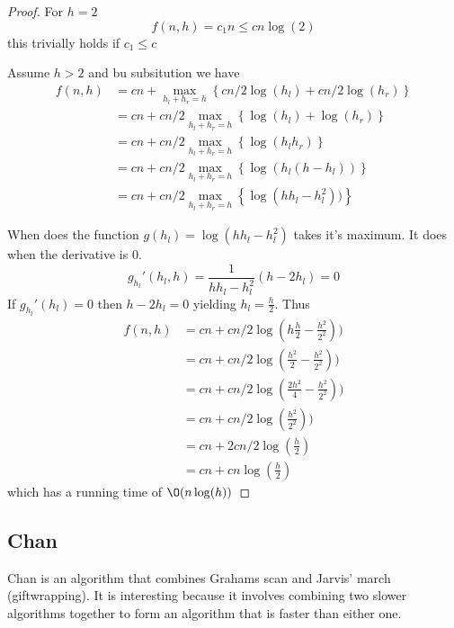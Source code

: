 \documentclass[10pt]{article}
\begin{document}
\begin{proof}

  For $h=2$                
  \begin{equation}
    f(n,h) = c_1n \leq cn\log(2)
  \end{equation}
  this trivially holds if $c_1 \leq c$
  
  Assume $h>2$ and bu subsitution we have
  \begin{align*}
   f(n,h) &= cn + \max_{h_l+h_r = h}\left\{cn/2\log(h_l)+cn/2\log(h_r)\right\} \\
          &= cn + cn/2\max_{h_l+h_r = h}\left\{\log(h_l)+\log(h_r)\right\} \\
          &= cn + cn/2\max_{h_l+h_r = h}\left\{\log(h_lh_r)\right\} \\          
          &= cn + cn/2\max_{h_l+h_r = h}\left\{\log(h_l(h-h_l))\right\} \\         
          &= cn + cn/2\max_{h_l+h_r = h}\left\{\log(hh_l-h_l^2))\right\}                    
  \end{align*}
    
  When does the function $g(h_l) = \log(hh_l-h_l^2)$ takes it's maximum. It does when the derivative is $0$.
  \begin{equation}
    g_{h_l}'(h_l,h) = \frac{1}{hh_l-h_l^2} (h-2h_l) = 0 
  \end{equation}
  If $g_{h_l}'(h_l)=0$ then $h-2h_l=0$ yielding $h_l = \frac{h}{2}$. Thus
  \begin{align*}
   f(n,h) &= cn + cn/2\log(h\frac{h}{2}-\frac{h^2}{2^2})) \\
          &= cn + cn/2\log(\frac{h^2}{2}-\frac{h^2}{2^2})) \\   
          &= cn + cn/2\log(\frac{2h^2}{4}-\frac{h^2}{2^2})) \\
          &= cn + cn/2\log(\frac{h^2}{2^2})) \\                       
          &= cn + 2cn/2\log(\frac{h}{2}) \\                                 
          &= cn + cn\log(\frac{h}{2})                                 
  \end{align*}
   which has a running time of $\O(n\log(h))$
   
\end{proof}



\subsection{Chan} %
\label{sub:chan_and_relations_to_mbc}
Chan is an algorithm that combines Grahams scan and Jarvis' march (giftwrapping). It is interesting because it involves combining two slower algorithms together to form an algorithm that is faster than either one.
\end{document}
